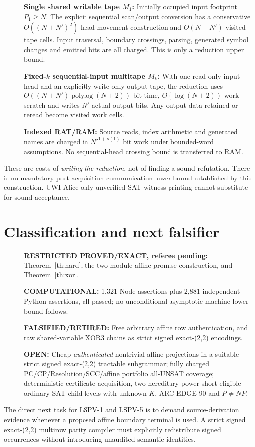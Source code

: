 \documentclass[11pt]{article}
\begin{document}
\begin{description}
\item[] \textbf{Single shared writable tape $M_1$:}
Initially occupied input footprint $P_1\ge N$.
The explicit sequential scan/output conversion
has a conservative $O((N+N')^2)$ head-movement
construction and $O(N+N')$ visited tape cells.
Input traversal, boundary crossings, parsing,
generated symbol changes and emitted bits are
all charged. This is only a reduction upper bound.
\item[] \textbf{Fixed-$k$ sequential-input
multitape $M_k$:} With one read-only input
head and an explicitly write-only output tape,
the reduction uses
$O((N+N')\operatorname{polylog}(N+2))$ bit-time,
$O(\log(N+2))$ work scratch and writes $N'$
actual output bits. Any output data retained
or reread become visited work cells.
\item[] \textbf{Indexed RAT/RAM:} Source reads,
index arithmetic and generated names are
charged in $N'^{1+o(1)}$ bit work under
bounded-word assumptions. No sequential-head
crossing bound is transferred to RAM.
\end{description}
These are costs of \emph{writing the reduction},
not of finding a sound refutation. There
is no mandatory post-acquisition communication
lower bound established by this construction.
UWI Alice-only unverified SAT witness printing
cannot substitute for sound acceptance.

\section{Classification and next falsifier}
\begin{description}
\item[] \textbf{RESTRICTED PROVED/EXACT, referee pending:}
Theorem~\ref{th:hard}, the two-module
affine-promise construction, and
Theorem~\ref{th:xor}.
\item[] \textbf{COMPUTATIONAL:} 1,321 Node
assertions plus 2,881 independent Python
assertions, all passed; no unconditional
asymptotic machine lower bound follows.
\item[] \textbf{FALSIFIED/RETIRED:}
Free arbitrary affine row authentication,
and raw shared-variable XOR3 chains
as strict signed exact-(2,2) encodings.
\item[] \textbf{OPEN:}
Cheap \emph{authenticated} nontrivial
affine projections in a suitable strict
signed exact-(2,2) tractable subgrammar;
fully charged PC/CP/Resolution/SCC/affine
portfolio all-UNSAT coverage;
deterministic certificate acquisition,
two hereditary power-short eligible
ordinary SAT child levels with unknown
$K$, ARC-EDGE-90 and $P\ne NP$.
\end{description}
The direct next task for LSPV-1 and
LSPV-5 is to demand source-derivation
evidence whenever a proposed affine
boundary terminal is used. A strict
signed exact-(2,2) multirow parity
compiler must explicitly redistribute
signed occurrences without introducing
unaudited semantic identities.
\end{document}
